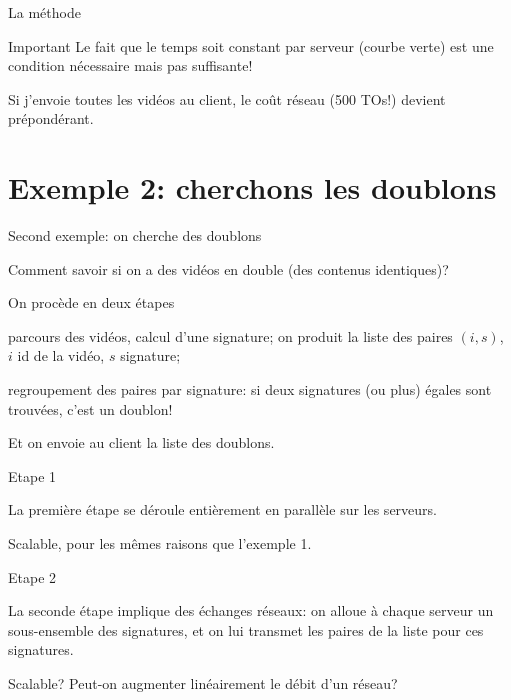 \begin{frame}{La méthode}



\vfill

\begin{remblock}{Important}
Le fait que le temps soit constant par serveur (courbe verte) est une condition nécessaire mais pas suffisante!
\end{remblock}

Si j'envoie \alert{toutes} les vidéos au client, le coût réseau (500 TOs!) devient prépondérant.
\end{frame}


\section{Exemple 2: cherchons les doublons}

\begin{frame}{Second exemple: on cherche des doublons}

Comment savoir si on a des vidéos en double (des \alert{contenus} identiques)?

\vfill

On procède en deux étapes

\begin{redbullet}

  \item parcours des vidéos, calcul d'une \alert{signature}; on produit la liste
  des paires $(i, s)$, $i$ id de la vidéo, $s$ signature;
  
  \item regroupement des paires par signature:  si deux signatures (ou plus) égales sont trouvées,
    c'est un doublon!
\end{redbullet}

Et on envoie au client la liste des doublons.
\end{frame}


\begin{frame}{Etape 1}

La première étape se déroule entièrement en parallèle sur les serveurs.

\vfill




\vfill

Scalable, pour les mêmes raisons que l'exemple 1.
\end{frame}


\begin{frame}{Etape 2}

La  seconde étape implique des échanges réseaux: on alloue à chaque serveur un
sous-ensemble des signatures, et on lui transmet les paires de la liste pour ces signatures.

\vfill



\vfill

Scalable? Peut-on augmenter linéairement le débit d'un réseau?

\end{frame}


